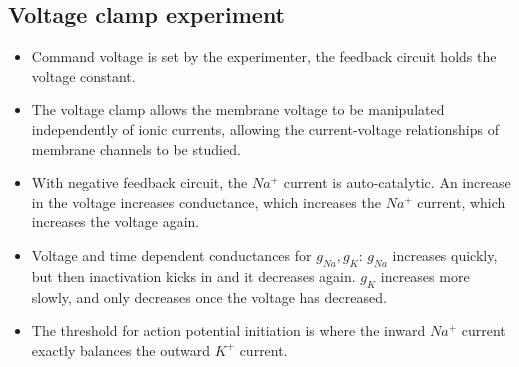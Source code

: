 \documentclass[a4paper, 12pt]{article}
\begin{document}
\subsection{Voltage clamp experiment}
\begin{itemize}[noitemsep,nolistsep]
	\item Command voltage is set by the experimenter, the feedback circuit holds the voltage constant.
	\item The voltage clamp allows the membrane voltage to be manipulated independently of ionic currents, allowing the current-voltage relationships of membrane channels to be studied.
	\item With negative feedback circuit, the $Na^+$ current is auto-catalytic. An increase in the voltage increases conductance, which increases the $Na^+$ current, which increases the voltage again.
	\item Voltage and time dependent conductances for $g_{Na}, g_{K}$:
	\subitem $g_{Na}$ increases quickly, but then inactivation kicks in and it decreases again.
	\subitem $g_K$ increases more slowly, and only decreases once the voltage has decreased.
	\item The threshold for action potential initiation is where the inward $Na^+$ current exactly balances the outward $K^+$ current.
\end{itemize}
\end{document}
